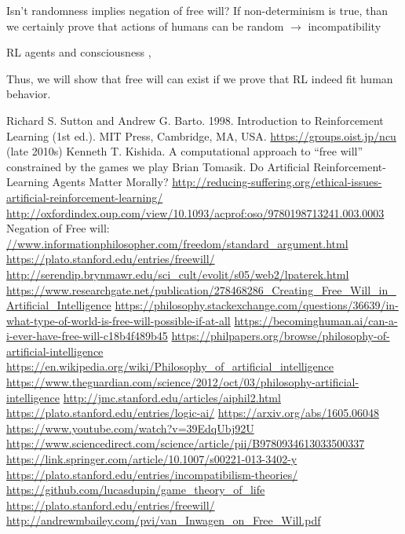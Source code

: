 \documentclass[a4paper]{article}
\begin{document}
Isn't randomness implies negation of free will?
If non-determinism is true, than we certainly prove that actions of humans can be random $\rightarrow$ incompatibility

RL agents and consciousness \cite{rlmorality1}, \cite{rlmorality2}

Thus, we will show that free will can exist if we prove that RL indeed fit human behavior.

\begin{thebibliography}{20}
 Richard S. Sutton and Andrew G. Barto. 1998. Introduction to Reinforcement Learning (1st ed.). MIT Press, Cambridge, MA, USA.
 \url{https://groups.oist.jp/ncu} (late 2010s)
 Kenneth T. Kishida. A computational approach to “free will” constrained by the games we play
 Brian Tomasik. Do Artificial Reinforcement-Learning Agents Matter Morally?
 \url{http://reducing-suffering.org/ethical-issues-artificial-reinforcement-learning/}
 \url{http://oxfordindex.oup.com/view/10.1093/acprof:oso/9780198713241.003.0003}
 Negation of Free will: \url{//www.informationphilosopher.com/freedom/standard_argument.html}
 \url{https://plato.stanford.edu/entries/freewill/}
 \url{http://serendip.brynmawr.edu/sci_cult/evolit/s05/web2/lpaterek.html}
 \url{https://www.researchgate.net/publication/278468286_Creating_Free_Will_in_Artificial_Intelligence}
 \url{https://philosophy.stackexchange.com/questions/36639/in-what-type-of-world-is-free-will-possible-if-at-all}
 \url{https://becominghuman.ai/can-a-i-ever-have-free-will-c18b4f489b45}
 \url{https://philpapers.org/browse/philosophy-of-artificial-intelligence}
 \url{https://en.wikipedia.org/wiki/Philosophy_of_artificial_intelligence}
 \url{https://www.theguardian.com/science/2012/oct/03/philosophy-artificial-intelligence}
 \url{http://jmc.stanford.edu/articles/aiphil2.html}
 \url{https://plato.stanford.edu/entries/logic-ai/}
 \url{https://arxiv.org/abs/1605.06048}
 \url{https://www.youtube.com/watch?v=39EdqUbj92U}
 \url{https://www.sciencedirect.com/science/article/pii/B9780934613033500337}
 \url{https://link.springer.com/article/10.1007/s00221-013-3402-y}
 \url{https://plato.stanford.edu/entries/incompatibilism-theories/}
 \url{https://github.com/lucasdupin/game_theory_of_life}
 \url{https://plato.stanford.edu/entries/freewill/}
 \url{http://andrewmbailey.com/pvi/van_Inwagen_on_Free_Will.pdf}

\end{thebibliography}
\end{document}
